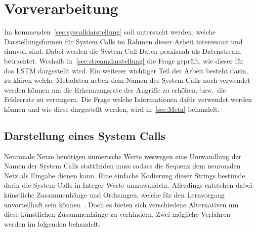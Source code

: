     \section{Vorverarbeitung}\label{sec:Preprocessing}
        Im kommenden~\autoref{sec:syscalldarstellung} soll untersucht werden, welche Darstellungsformen für System Calls im Rahmen dieser Arbeit interessant und sinnvoll sind.
        Dabei werden die System Call Daten praxisnah als Datenstream betrachtet.
        Weshalb in~\autoref{sec:streamdarstellung} die Frage geprüft, wie dieser für das \ac{LSTM} dargestellt wird.
        Ein weiterer wichtiger Teil der Arbeit besteht darin, zu klären welche Metadaten neben dem Namen des System Calls noch verwendet werden können um die Erkennungsrate der Angriffe zu erhöhen, bzw.\ die Fehlerrate zu verringern.
        Die Frage welche Informationen dafür verwendet werden können und wie diese dargestellt werden, wird in~\autoref{sec:Meta} behandelt.

        \subsection{Darstellung eines System Calls}\label{sec:syscalldarstellung}
            Neuronale Netze benötigen numerische Werte weswegen eine Umwandlung der Namen der System Calls stattfinden muss sodass die Sequenz dem neuronalen Netz als Eingabe dienen kann. 
            Eine einfache Kodierung dieser Strings bestünde darin die System Calls in Integer Werte umzuwandeln.
            Allerdings entstehen dabei künstliche Zusammenhänge und Ordnungen, welche für den Lernvorgang unvorteilhaft sein können~\cite{NEURALBISHOP1995}.
            Doch es bieten sich verschiedene Alternativen um diese künstlichen Zusammenhänge zu verhindern.
            Zwei mögliche Verfahren werden im folgenden behandelt.

